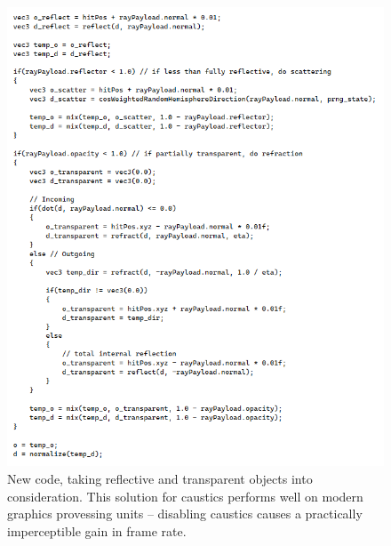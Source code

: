 \documentclass[12pt]{article}
\begin{document}
\begin{figure} 
\centering
  \includegraphics[width = 6 in]{code.png}
  \caption{ New code, taking reflective and transparent objects into consideration.
This solution for caustics performs well on modern graphics provessing units -- disabling caustics causes a practically imperceptible gain in frame rate.
}
\end{figure}
\end{document}
